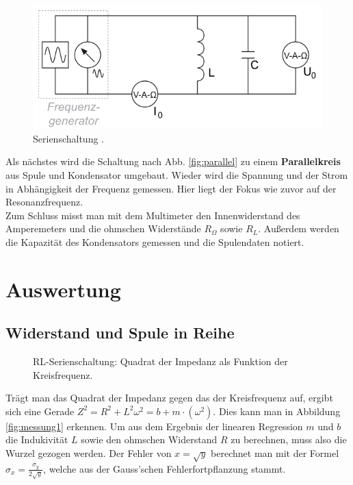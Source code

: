 \documentclass[12pt,a4paper,titlepage,headinclude,bibtotoc]{scrartcl}
\begin{document}
\begin{figure}[!htb]
	\centering
	\includegraphics[scale=1.0]{parallel.png}
	\caption{Serienschaltung \cite[Datum: 03.10.14]{LP14}.}
	\label{fig:parallel}
\end{figure}


Als nächstes wird die Schaltung nach Abb. \eqref{fig:parallel} zu einem \textbf{Parallelkreis} aus Spule und Kondensator umgebaut.
Wieder wird die Spannung und der Strom in Abhängigkeit der Frequenz gemessen.
Hier liegt der Fokus wie zuvor auf der Resonanzfrequenz.\\

Zum Schluss misst man mit dem Multimeter den Innenwiderstand des Amperemeters und die ohmschen Widerstände $R_\Omega$ sowie $R_L$.
Außerdem werden die Kapazität des Kondensators gemessen und die Spulendaten notiert. 

\section{Auswertung}
\label{sec:auswertung}
\subsection{Widerstand und Spule in Reihe}
\begin{figure}[!htb]
	\centering
	
	\caption{RL-Serienschaltung: Quadrat der Impedanz als Funktion der Kreisfrequenz.}
	\label{fig:messung1}
\end{figure}
Trägt man das Quadrat der Impedanz gegen das der Kreisfrequenz auf, ergibt sich eine Gerade $Z^2=R^2+L^2\omega^2=b+m\cdot(\omega^2)$.
Dies kann man in Abbildung \eqref{fig:messung1} erkennen.
Um aus dem Ergebnis der linearen Regression $m$ und $b$ die Indukivität  $L$ sowie den ohmschen Widerstand $R$ zu berechnen, muss also die Wurzel gezogen werden.
Der Fehler von $x=\sqrt{y}$ berechnet man mit der Formel $\sigma_x=\frac{\sigma_y}{2\sqrt{y}}$, welche aus der Gauss'schen  Fehlerfortpflanzung stammt.
\end{document}
